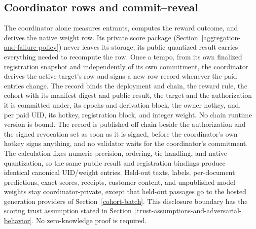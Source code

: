 \subsection{Coordinator rows and commit--reveal}\label{independent-weight-calculation}

The coordinator alone measures entrants, computes the reward outcome, and
derives the native weight row. Its private score package
(Section~\ref{aggregation-and-failure-policy}) never leaves its storage; its
public quantized result carries everything needed to recompute the row.
Once a tempo, from its own finalized registration snapshot and independently of
its own commitment, the coordinator derives the active target's row and signs a
new row record whenever the paid entries change. The record binds the
deployment and chain, the reward rule, the cohort with its manifest digest and
public result, the target and the authorization it is committed under, its
epochs and derivation block, the owner hotkey, and, per paid UID, its hotkey,
registration block, and integer weight. No chain runtime version is bound. The
record is published off chain beside the authorization and the signed
revocation set as soon as it is signed, before the coordinator's own hotkey
signs anything, and no validator waits for the coordinator's commitment. The
calculation fixes numeric precision, ordering, tie handling, and native
quantization, so the same public result and registration bindings produce
identical canonical UID/weight entries. Held-out texts, labels, per-document
predictions, exact scores, receipts, customer content, and unpublished model
weights stay coordinator-private, except that held-out passages go to the
hosted generation providers of Section~\ref{cohort-batch}. This disclosure boundary has the scoring
trust assumption stated in
Section~\ref{trust-assumptions-and-adversarial-behavior}. No zero-knowledge
proof is required.

